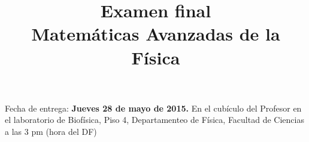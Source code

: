 
\usepackage{enumerate}
\usepackage{pifont}
\renewcommand{\labelitemi}{\ding{43}}
\title{{Examen final} \\ {\large Matemáticas Avanzadas de la Física}}
\date{ }

\renewcommand\labelenumii{\theenumi.{\arabic{enumii}})}
\maketitle
\fontsize{14}{14}\selectfont
Fecha de entrega: \textbf{Jueves 28 de mayo de 2015.} En el cubículo del Profesor en el laboratorio de Biofísica, Piso 4, Departamenteo de Física, Facultad de Ciencias a las 3 pm (hora del DF)
\\
